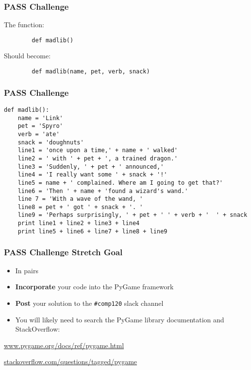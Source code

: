 \begin{frame}[fragile]
	\frametitle{PASS Challenge}
		
	The function:

	\begin{lstlisting}
		def madlib()
	\end{lstlisting}
	
	\vspace{1.5em}
	
	Should become:
	
	\begin{lstlisting}
		def madlib(name, pet, verb, snack)
	\end{lstlisting}
	
\end{frame}

\begin{frame}[fragile]
	\frametitle{PASS Challenge}
	
	\begin{lstlisting}
def madlib():
	name = 'Link'
	pet = 'Spyro'
	verb = 'ate'
	snack = 'doughnuts'
	line1 = 'once upon a time,' + name + ' walked'
	line2 = ' with ' + pet + ', a trained dragon.'
	line3 = 'Suddenly, ' + pet + ' announced,'
	line4 = 'I really want some ' + snack + '!'
	line5 = name + ' complained. Where am I going to get that?'
	line6 = 'Then ' + name + 'found a wizard's wand.'
	line 7 = 'With a wave of the wand, '
	line8 = pet + ' got ' + snack + '. '
	line9 = 'Perhaps surprisingly, ' + pet + ' ' + verb + '  ' + snack
	print line1 + line2 + line3 + line4
	print line5 + line6 + line7 + line8 + line9
\end{lstlisting}
	
\end{frame}

\begin{frame}[fragile]
	\frametitle{PASS Challenge Stretch Goal}
	
	\begin{itemize}
		\item In pairs
		\item \textbf{Incorporate} your code into the PyGame framework
		\item \textbf{Post} your solution to the \lstinline{#comp120} slack channel
		\item You will likely need to search the PyGame library documentation and StackOverflow:
	\end{itemize}
	
	\vspace{2em}
	\url{www.pygame.org/docs/ref/pygame.html}
	
	\vspace{1em}
	\url{stackoverflow.com/questions/tagged/pygame}
	
\end{frame}

